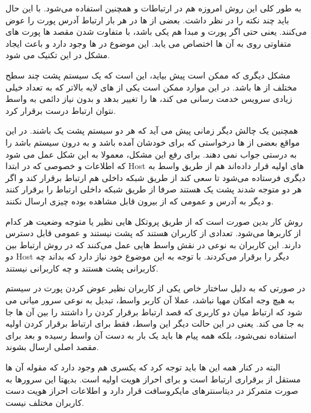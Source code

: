 \documentclass[12pt]{article}
\begin{document}
\begin{enumerate}
به طور کلی این روش امروزه هم در ارتباطات  و همچنین  استفاده می‌شود. با این حال باید چند نکته را در نظر داشت. بعضی از  ها در هر بار ارتباط آدرس پورت را عوض می‌کنند. یعنی حتی اگر پورت و  مبدا هم یکی باشد، با متفاوت شدن مقصد ها پورت های متفاوتی روی  به آن ها اختصاص می یابد. این موضوع در  ها وجود دارد و باعث ایجاد مشکل در این تکنیک می شود.

مشکل دیگری که ممکن است پیش بیاید، این است که یک سیستم پشت چند سطح مختلف از  ها باشد. در این موارد ممکن است یکی از  های لایه بالاتر که به تعداد خیلی زیادی سرویس خدمت رسانی می کند،  ها را تغییر بدهد و بدون نیاز دائمی به واسط  نتوان ارتباط درست  برقرار کرد.

همچنین یک چالش دیگر زمانی پیش می آید که هر دو سیستم پشت یک  باشند. در این مواقع بعضی از  ها درخواستی که برای خودشان آمده باشد و  به درون سیستم باشد را به درستی جواب نمی دهند. برای رفع این مشکل، معمولا به این شکل عمل می شود که اطلاعات  و  خصوصی که در ابتدا Host های اولیه قرار داده‌اند هم از طریق واسط به دیگری فرستاده می‌شود تا سعی کند از طریق شبکه داخلی هم ارتباط برقرار کند و اگر هر دو متوجه شدند پشت یک  هستند صرفا از طریق شبکه داخلی ارتباط را برقرار کنند و دیگر به آدرس  و  عمومی  که از بیرون قابل مشاهده بوده چیزی ارسال نکنند.

روش کار  بدین صورت است که از طریق پروتکل هایی نظیر  یا  متوجه وضعیت  هر کدام از کاربرها می‌شود. تعدادی از کاربران هستند که پشت  نیستند و  عمومی قابل دسترس دارند. این کاربران به نوعی در نقش واسط هایی عمل می‌کنند که در روش  ارتباط بین دو Host دیگر را برقرار می‌کردند. با توجه به این موضوع خود  نیاز دارد که بداند چه کاربرانی پشت  هستند و چه کاربرانی نیستند.

در صورتی که به دلیل ساختار خاص  یکی از کاربران نظیر عوض کردن پورت در سیستم   به هیچ وجه امکان  مهیا نباشد، عملا آن کاربر واسط، تبدیل به نوعی سرور میانی می شود که ارتباط میان دو کاربری که قصد ارتباط برقرار کردن را داشتند را بین آن ها جا به جا می کند. یعنی در این حالت دیگر این واسط، فقط برای ارتباط برقرار کردن اولیه استفاده نمی‌شود، بلکه همه پیام ها باید یک بار به دست آن واسط رسیده و بعد برای مقصد اصلی ارسال بشوند.

البته در کنار همه این ها باید توجه کرد که یکسری  هم وجود دارد که مقوله آن ها مستقل از برقراری ارتباط است و برای احراز هویت اولیه است. بدیهتا این سرورها به صورت متمرکز در دیتاسنترهای مایکروسافت قرار دارد و اطلاعات احراز هویت دست کاربران مختلف نیست.


\end{enumerate}
\end{document}
